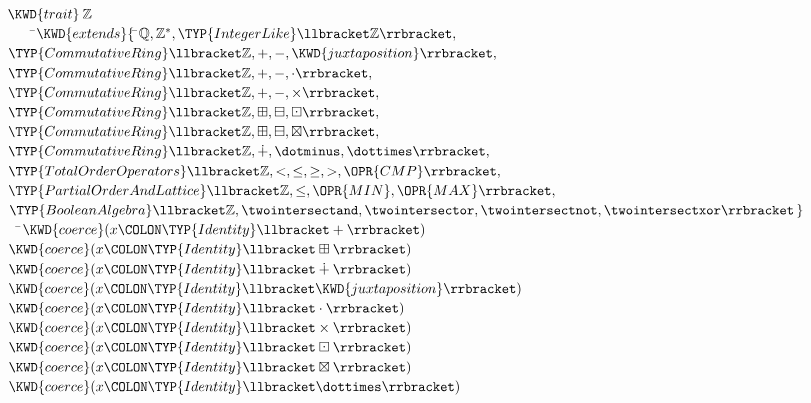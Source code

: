 \begin{Fortress}
\(\KWD{trait}\mskip 4mu plus 4mu\mathbb{Z}\)\\
{\tt~~~~}\pushtabs\=\+\(    \KWD{extends} \{\, \null\)\pushtabs\=\+\(\mathbb{Q}, \mathbb{Z}^*, \TYP{IntegerLike}\llbracket\mathbb{Z}\rrbracket,\)\\
\(              \TYP{CommutativeRing}\llbracket\mathbb{Z},+,-,\KWD{juxtaposition}\rrbracket,\)\\
\(              \TYP{CommutativeRing}\llbracket\mathbb{Z},+,-,\cdot\rrbracket,\)\\
\(              \TYP{CommutativeRing}\llbracket\mathbb{Z},+,-,\times\rrbracket,\)\\
\(              \TYP{CommutativeRing}\llbracket\mathbb{Z},\boxplus,\boxminus,\boxdot\rrbracket,\)\\
\(              \TYP{CommutativeRing}\llbracket\mathbb{Z},\boxplus,\boxminus,\boxtimes\rrbracket,\)\\
\(              \TYP{CommutativeRing}\llbracket\mathbb{Z},\dotplus,\dotminus,\dottimes\rrbracket,\)\\
\(              \TYP{TotalOrderOperators}\llbracket\mathbb{Z},<,\leq,\geq,>,\OPR{CMP}\rrbracket,\)\\
\(              \TYP{PartialOrderAndLattice}\llbracket\mathbb{Z},\leq,\OPR{MIN},\OPR{MAX}\rrbracket,\)\\
\(              \TYP{BooleanAlgebra}\llbracket\mathbb{Z},\twointersectand,\twointersector,\twointersectnot,\twointersectxor\rrbracket\,\}\)\-\-\\\poptabs\poptabs
{\tt~~}\pushtabs\=\+\(  \KWD{coerce}(x\COLON \TYP{Identity}\llbracket+\rrbracket)\)\\
\(  \KWD{coerce}(x\COLON \TYP{Identity}\llbracket\boxplus\rrbracket)\)\\
\(  \KWD{coerce}(x\COLON \TYP{Identity}\llbracket\dotplus\rrbracket)\)\\
\(  \KWD{coerce}(x\COLON \TYP{Identity}\llbracket\KWD{juxtaposition}\rrbracket)\)\\
\(  \KWD{coerce}(x\COLON \TYP{Identity}\llbracket\cdot\rrbracket)\)\\
\(  \KWD{coerce}(x\COLON \TYP{Identity}\llbracket\times\rrbracket)\)\\
\(  \KWD{coerce}(x\COLON \TYP{Identity}\llbracket\boxdot\rrbracket)\)\\
\(  \KWD{coerce}(x\COLON \TYP{Identity}\llbracket\boxtimes\rrbracket)\)\\
\(  \KWD{coerce}(x\COLON \TYP{Identity}\llbracket\dottimes\rrbracket)\)\\

\end{Fortress}
